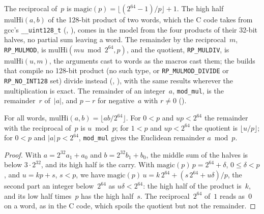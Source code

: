 \begin{definition}\label{def:reciprocal}
  \leanok
  The reciprocal of~$p$ is $\mathrm{magic}(p) = \lfloor (2^{64} - 1)/p \rfloor + 1$. The high half
  $\mathrm{mulHi}(a, b)$ of the 128-bit product of two words, which the C code takes from gcc's
  \verb|__uint128_t| (, ), comes in
  the model from the four products of their 32-bit halves, no partial sum leaving a word. The
  remainder by the reciprocal~$m$, \verb|RP_MULMOD|, is $\mathrm{mulHi}(m u \bmod 2^{64}, p)$, and
  the quotient, \verb|RP_MULDIV|, is $\mathrm{mulHi}(u, m)$, the arguments cast to words as the
  macros cast them; the builds that compile no 128-bit product (no such type, or
  \verb|RP_MULMOD_DIVIDE| or \verb|RP_NO_INT128| set) divide instead
  (, ), with the same results
  wherever the multiplication is exact. The remainder of an integer~$a$, \verb|mod_mul|, is the
  remainder~$r$ of~$|a|$, and $p - r$ for negative~$a$ with $r \ne 0$ ().
\end{definition}

\begin{lemma}\label{lem:reciprocal}
  \leanok
  For all words, $\mathrm{mulHi}(a, b) = \lfloor a b / 2^{64} \rfloor$. For $0 < p$ and
  $u p < 2^{64}$ the remainder with the reciprocal of~$p$ is $u \bmod p$; for $1 < p$ and
  $u p < 2^{64}$ the quotient is $\lfloor u/p \rfloor$; for $0 < p$ and $|a|\,p < 2^{64}$,
  \verb|mod_mul| gives the Euclidean remainder $a \bmod p$.
\end{lemma}

\begin{proof}
  \leanok
  With $a = 2^{32} a_1 + a_0$ and $b = 2^{32} b_1 + b_0$, the middle sum of the halves is below
  $3 \cdot 2^{32}$, and its high half is the carry. With $\mathrm{magic}(p)\, p = 2^{64} + \delta$,
  $0 \le \delta < p$, and $u = k p + s$, $s < p$, we have $\mathrm{magic}(p)\, u = k\, 2^{64} +
  (s\, 2^{64} + u \delta)/p$, the second part an integer below~$2^{64}$ as $u \delta < 2^{64}$: the
  high half of the product is~$k$, and its low half times~$p$ has the high half~$s$. The
  reciprocal~$2^{64}$ of~$1$ reads as~$0$ on a word, as in the C code, which spoils the quotient but
  not the remainder.
\end{proof}

